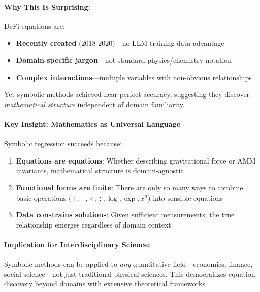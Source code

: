 \paragraph{Why This Is Surprising:}

DeFi equations are:
\begin{itemize}
    \item \textbf{Recently created} (2018-2020)—no LLM training data advantage
    \item \textbf{Domain-specific jargon}—not standard physics/chemistry notation
    \item \textbf{Complex interactions}—multiple variables with non-obvious relationships
\end{itemize}

Yet symbolic methods achieved near-perfect accuracy, suggesting they discover \emph{mathematical structure} independent of domain familiarity.

\paragraph{Key Insight: Mathematics as Universal Language}

Symbolic regression succeeds because:
\begin{enumerate}
    \item \textbf{Equations are equations}: Whether describing gravitational force or AMM invariants, mathematical structure is domain-agnostic

    \item \textbf{Functional forms are finite}: There are only so many ways to combine basic operations ($+, -, \times, \div, \log, \exp, x^n$) into sensible equations

    \item \textbf{Data constrains solutions}: Given sufficient measurements, the true relationship emerges regardless of domain context
\end{enumerate}

\paragraph{Implication for Interdisciplinary Science:}

Symbolic methods can be applied to \emph{any} quantitative field—economics, finance, social science—not just traditional physical sciences. This democratizes equation discovery beyond domains with extensive theoretical frameworks.



